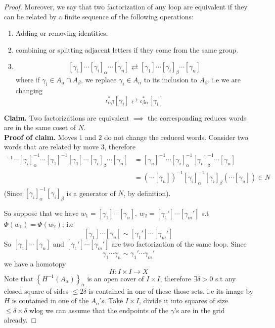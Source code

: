\documentclass[11pt,a4paper]{article}
\theoremstyle{definition}
\theoremstyle{plain}
\theoremstyle{remark}
\renewcommand{\set}[1]{\left\{ #1 \right\}}
\newcommand{\1}{\mathbbm{1}}
\begin{document}
\begin{proof}
    Moreover, we say that two factorization of any loop are equivalent if they can be related by a finite sequence of the following operations: 
    \begin{enumerate}
        \item Adding or removing identities. 
        \item combining or splitting adjacent letters if they come from the same group. 
        \item $$[\gamma_1] \cdots [\gamma_i]_{\alpha} \cdots [\gamma_n] \rightleftarrows [\gamma_1] \cdots [\gamma_i]_{\beta} \cdots [\gamma_n]$$
        where if $\gamma_i \in A_\alpha \cap A_\beta$, we replace $\gamma_i \in A_\alpha$ to its inclusion to $A_\beta$. i.e we are changing 
        $$\iota^*_{\alpha \beta} [\gamma_i] \rightleftarrows \iota^*_{\beta \alpha} [\gamma_i]$$  
    \end{enumerate}

    \textbf{Claim.} Two factorizations are equivalent $\implies$ the corresponding reduces words are in the same coset of $N$. \\
    \textbf{Proof of claim.} Moves $1$ and $2$ do not change the reduced words. Consider two words that are related by move $3$, therefore 
    \begin{align*}
        [\gamma_n]^{-1} \cdots [\gamma_i]_{\alpha}^{-1} \cdots [\gamma_1]^{-1} [\gamma_1] \cdots [\gamma_i]_\beta \cdots [\gamma_n] &= [\gamma_n]^{-1} \cdots [\gamma_i]_\alpha^{-1} [\gamma_i]_\beta^{-1} \cdots [\gamma_n] \\
        &= (\cdots [\gamma_n])^{-1} [\gamma_i]^{-1}_\alpha [\gamma_i]_\beta (\cdots [\gamma_n]) \in N
    \end{align*}
    (Since $[\gamma_i]^{-1}_\alpha [\gamma_i]_\beta$ is a generator of $N$, by definition). 

    So suppose that we have $w_1 = [\gamma_1] \cdots [\gamma_n], \ w_2 = [\gamma_1'] \cdots [\gamma_m']$ s.t $\Phi(w_1) = \Phi(w_2)$; i.e 
    $$[\gamma_1] \cdots [\gamma_n] \sim [\gamma_1'] \cdots [\gamma_m']$$
    So $[\gamma_1] \cdots [\gamma_n]$ and $[\gamma_1'] \cdots [\gamma_m']$ are two factorization of the same loop. Since 
    $$\gamma_1 \cdots \gamma_n \sim \gamma_1' \cdots \gamma_m'$$
    we have a homotopy 
    $$H \colon I \times I \to X$$
    Note that $\set{H^{-1} (A_\alpha)}_\alpha$ is an open cover of $I \times I$, therefore $\exists \delta > 0$ s.t any closed square of sides $\le 2 \delta$ is contained in one of
    these those sets. i.e its image by $H$ is contained in one of the $A_\alpha$'s. Take $I \times I$, divide it into squares of size $\le \delta \times \delta$ wlog 
    we can assume that the endpoints of the $\gamma$'s are in the grid already.


\end{proof}
\end{document}
